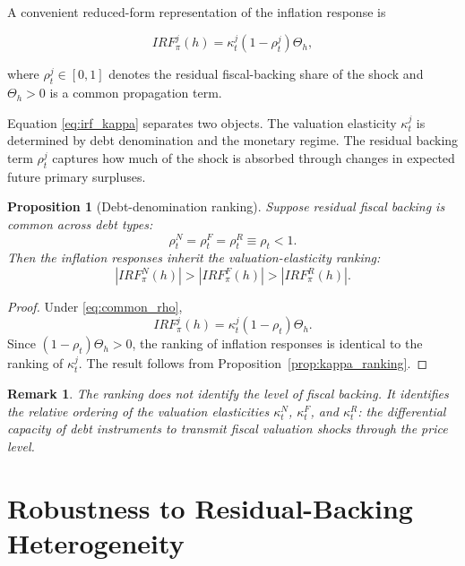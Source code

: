 \documentclass[12pt,a4paper]{article}
\newtheorem{proposition}{Proposition}
\newtheorem{remark}{Remark}
\begin{document}
A convenient reduced-form representation of the inflation response is

\begin{equation}
IRF_{\pi}^j(h)
=
\kappa_t^j
(1-\rho_t^j)
\Theta_h,
\label{eq:irf_kappa}
\end{equation}

where $\rho_t^j\in[0,1]$ denotes the residual fiscal-backing share of the shock and
$\Theta_h>0$ is a common propagation term.

Equation \eqref{eq:irf_kappa} separates two objects. The valuation elasticity
$\kappa_t^j$ is determined by debt denomination and the monetary regime. The residual
backing term $\rho_t^j$ captures how much of the shock is absorbed through changes in
expected future primary surpluses.

\begin{proposition}[Debt-denomination ranking]
Suppose residual fiscal backing is common across debt types:
\begin{equation}
\rho_t^N=\rho_t^F=\rho_t^R\equiv \rho_t<1.
\label{eq:common_rho}
\end{equation}
Then the inflation responses inherit the valuation-elasticity ranking:
\begin{equation}
|IRF_{\pi}^N(h)|
>
|IRF_{\pi}^F(h)|
>
|IRF_{\pi}^R(h)|.
\label{eq:irf_ranking}
\end{equation}
\end{proposition}


\begin{proof}
Under \eqref{eq:common_rho},
\begin{equation}
IRF_{\pi}^j(h)
=
\kappa_t^j(1-\rho_t)\Theta_h.
\end{equation}
Since $(1-\rho_t)\Theta_h>0$, the ranking of inflation responses is identical to the
ranking of $\kappa_t^j$. The result follows from Proposition~\ref{prop:kappa_ranking}.
\end{proof}



\begin{remark}
The ranking does not identify the level of fiscal backing. It identifies the relative
ordering of the valuation elasticities $\kappa_t^N$, $\kappa_t^F$, and $\kappa_t^R$:
the differential capacity of debt instruments to transmit fiscal valuation shocks through
the price level.
\end{remark}

\section{Robustness to Residual-Backing Heterogeneity}
\end{document}

